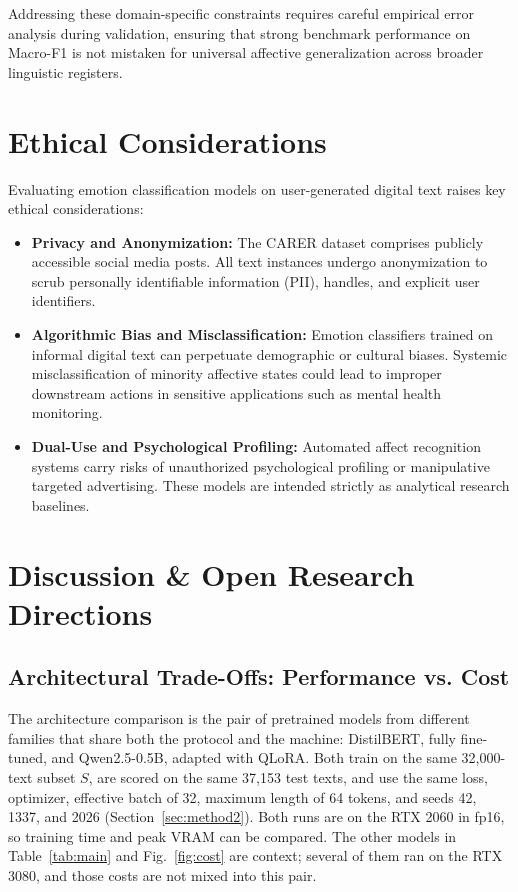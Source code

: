 \documentclass[conference]{IEEEtran}
\begin{document}
Addressing these domain-specific constraints requires careful empirical error analysis during validation, ensuring that strong benchmark 
performance on Macro-F1 is not mistaken for universal affective generalization across broader linguistic registers.



\section{Ethical Considerations}
\label{sec:ethics}

Evaluating emotion classification models on user-generated digital text raises key ethical considerations:
\begin{itemize}
    \item \textbf{Privacy and Anonymization:} The CARER dataset comprises publicly accessible social media posts. All text instances undergo anonymization to scrub personally identifiable information (PII), handles, and explicit user identifiers.
    \item \textbf{Algorithmic Bias and Misclassification:} Emotion classifiers trained on informal digital text can perpetuate demographic or cultural biases. Systemic misclassification of minority affective states could lead to improper downstream actions in sensitive applications such as mental health monitoring.
    \item \textbf{Dual-Use and Psychological Profiling:} Automated affect recognition systems carry risks of unauthorized psychological profiling or manipulative targeted advertising. These models are intended strictly as analytical research baselines.
\end{itemize}

\section{Discussion \& Open Research Directions}
\label{sec:discussion}

\subsection{Architectural Trade-Offs: Performance vs. Cost}
\label{sec:arch-tradeoff}
The architecture comparison is the pair of pretrained models from different families that share both the protocol and the machine: DistilBERT, fully fine-tuned, and Qwen2.5-0.5B, adapted with QLoRA. Both train on the same 32,000-text subset $S$, are scored on the same 37,153 test texts, and use the same loss, optimizer, effective batch of 32, maximum length of 64 tokens, and seeds 42, 1337, and 2026 (Section~\ref{sec:method2}). Both runs are on the RTX 2060 in fp16, so training time and peak VRAM can be compared. The other models in Table~\ref{tab:main} and Fig.~\ref{fig:cost} are context; several of them ran on the RTX 3080, and those costs are not mixed into this pair.
\end{document}
